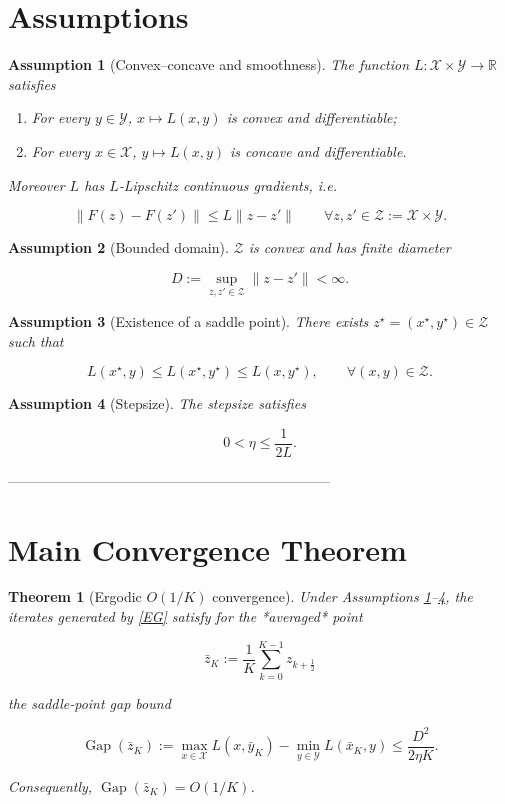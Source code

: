 \documentclass{article}
\newtheorem{assumption}{Assumption}
\newtheorem{theorem}{Theorem}
\newcommand{\gap}{\operatorname{Gap}}
\newcommand{\RR}{\mathbb{R}}
\begin{document}
\newpage
\section*{Assumptions}
\begin{assumption}[Convex–concave and smoothness]\label{ass:convex}
The function $L:\mathcal{X}\times\mathcal{Y}\to\RR$ satisfies
\begin{enumerate}
\item For every $y\in\mathcal{Y}$, $x\mapsto L(x,y)$ is convex and differentiable;
\item For every $x\in\mathcal{X}$, $y\mapsto L(x,y)$ is concave and differentiable.
\end{enumerate}
Moreover $L$ has $L$‑Lipschitz continuous gradients, i.e.

\[
\|F(z)-F(z')\|\le L\|z-z'\|\qquad\forall z,z'\in\mathcal{Z}:=\mathcal{X}\times\mathcal{Y}.
\tag{A1}
\]
\end{assumption}

\begin{assumption}[Bounded domain]\label{ass:bounded}
$\mathcal{Z}$ is convex and has finite diameter  

\[
D:=\sup_{z,z'\in\mathcal{Z}}\|z-z'\|<\infty .
\tag{A2}
\]
\end{assumption}

\begin{assumption}[Existence of a saddle point]\label{ass:saddle}
There exists $z^{\star}=(x^{\star},y^{\star})\in\mathcal{Z}$ such that  

\[
L(x^{\star},y)\le L(x^{\star},y^{\star})\le L(x,y^{\star}),\qquad\forall (x,y)\in\mathcal{Z}.
\tag{A3}
\]
\end{assumption}

\begin{assumption}[Stepsize]\label{ass:stepsize}
The stepsize satisfies  

\[
0<\eta\le \frac{1}{2L}.
\tag{A4}
\]
\end{assumption}

---------------------------------------------------------------------

\section*{Main Convergence Theorem}
\begin{theorem}[Ergodic $O(1/K)$ convergence]\label{thm:ergodic}
Under Assumptions \ref{ass:convex}–\ref{ass:stepsize}, the iterates generated by \eqref{EG} satisfy for the *averaged* point  

\[
\bar z_K:=\frac1K\sum_{k=0}^{K-1}z_{k+\frac12}
\]

the saddle‑point gap bound  

\[
\gap(\bar z_K):=
\max_{x\in\mathcal{X}}L(x,\bar y_K)-\min_{y\in\mathcal{Y}}L(\bar x_K,y)
\le \frac{D^{2}}{2\eta K}.
\tag{2}
\]

Consequently, $\gap(\bar z_K)=O(1/K)$.
\end{theorem}
\end{document}
